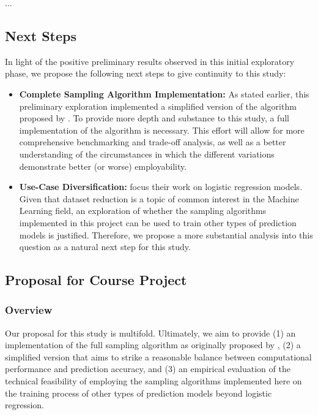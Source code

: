 \documentclass{article}
\theoremstyle{plain}
\theoremstyle{definition}
\theoremstyle{remark}
\begin{document}
...

\subsection{Next Steps}

In light of the positive preliminary results observed in this initial exploratory phase, we propose the following next steps to give continuity to this study:
\begin{itemize}

 \item \textbf{Complete Sampling Algorithm Implementation:} As stated earlier, this preliminary exploration implemented a simplified version of the algorithm proposed by \citeauthor{chow24}. To provide more depth and substance to this study, a full implementation of the algorithm is necessary. This effort will allow for more comprehensive benchmarking and trade-off analysis, as well as a better understanding of the circumstances in which the different variations demonstrate better (or worse) employability.

\item \textbf{Use-Case Diversification:} \citeauthor{chow24} focus their work on logistic regression models. Given that dataset reduction is a topic of common interest in the Machine Learning field, an exploration of whether the sampling algorithms implemented in this project can be used to train other types of prediction models is justified. Therefore, we propose a more substantial analysis into this question as a natural next step for this study.

\end{itemize}


\subsection{Proposal for Course Project}

\subsubsection{Overview}

Our proposal for this study is multifold. Ultimately, we aim to provide (1) an implementation of the full sampling algorithm as originally proposed by \citeauthor{chow24}, (2) a simplified version that aims to strike a reasonable balance between computational performance and prediction accuracy, and (3) an empirical evaluation of the technical feasibility of employing the sampling algorithms implemented here on the training process of other types of prediction models beyond logistic regression.
\end{document}
